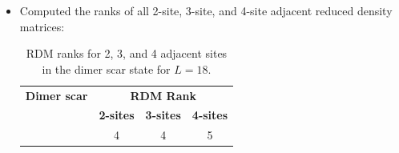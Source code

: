 \documentclass[11pt]{article}
\begin{document}
\begin{itemize}
\begin{itemize}
        \item Computed the ranks of all 2-site, 3-site, and 4-site adjacent reduced density matrices:
        
	\begin{table}[h]
	\centering
	\begin{tabular}{|c|ccc|}
	\hline
	\textbf{Dimer scar} & \multicolumn{3}{c|}{\textbf{RDM  Rank}} \\
	\cline{2-4}
	& \textbf{2-sites} & \textbf{3-sites} & \textbf{4-sites} \\
	\hline
	\text{$| \text{dimer} \rangle$} & 4 & 4 & 5 \\
	\hline
	\end{tabular}
	\caption{RDM ranks for 2, 3, and 4 adjacent sites in the dimer scar state for $L=18$.}
	\label{tab:ranks}
	\end{table}

\end{itemize}
\end{itemize}

\vspace{0.3cm}
\end{document}
